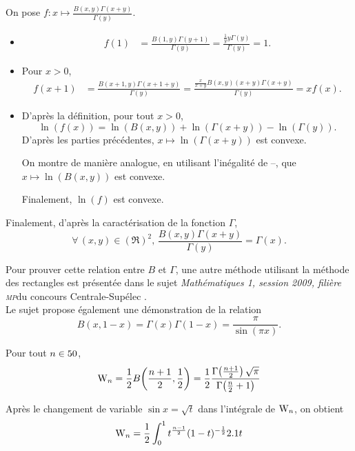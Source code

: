\begin{demo}
On pose $f : x \mapsto \frac{B(x, y) \Gamma(x + y)}{\Gamma(y)}$.
\begin{itemize}
\item
\begin{align*}
f(1)
&= \frac{B(1, y) \Gamma(y + 1)}{\Gamma(y)}
= \frac{\frac{1}{y} y \Gamma(y)}{\Gamma(y)}
= 1.
\end{align*}

\item Pour $x > 0$,
\begin{align*}
f(x + 1)
&= \frac{B(x + 1, y) \Gamma(x + 1 + y)}{\Gamma(y)}
= \frac{\frac{x}{x + y} B(x, y) (x + y) \Gamma(x + y)}{\Gamma(y)}
= x f(x).
\end{align*}

\item D'après la définition, pour tout $x > 0$,
\[
\ln(f(x)) = \ln(B(x, y)) + \ln(\Gamma(x + y)) - \ln(\Gamma(y)).
\]
D'après les parties précédentes, $x \mapsto \ln(\Gamma(x + y))$ est convexe.

On montre de manière analogue, en utilisant l'inégalité de --, que $x \mapsto \ln(B(x, y))$ est convexe.

Finalement, $\ln(f)$ est convexe.
\end{itemize}
Finalement, d'après la caractérisation de la fonction $\Gamma$,
\[
\forall\, (x, y) \in (\Re)^2,\,
\frac{B(x, y) \Gamma(x + y)}{\Gamma(y)} = \Gamma(x).
\]
\end{demo}

\begin{remarque}
Pour prouver cette relation entre $B$ et $\Gamma$, une autre méthode utilisant la méthode des rectangles est présentée dans le sujet \textsl{Mathématiques 1, session 2009, filière \textsc{mp}}du concours Centrale-Supélec \cite{cs_1_2009}. \\
Le sujet propose également une démonstration de la relation 
\[
B(x, 1 - x) = \Gamma(x) \Gamma(1 - x) = \frac{\pi}{\sin(\pi x)}.
\]
\end{remarque}


\begin{theo}{}
Pour tout $n \in 50$,
\[
\mathrm{W}_n = \frac{1}{2} B\mathopen{}\left(\frac{n+1}{2}, \frac{1}{2} \right) = \frac{1}{2} \frac{\Gamma\mathopen{}\left(\frac{n+1}{2}\right) \sqrt{\pi}}{\Gamma\mathopen{}\left(\frac{n}{2}+1\right)}
\]
\end{theo}

\begin{elemdemo}
Après le changement de variable $\sin x = \sqrt{t}$ dans l'intégrale de  $\mathrm{W}_n$, on obtient
\[
\mathrm{W}_n = \frac{1}{2} \int_0^1 t^{\frac{n-1}{2}} (1-t)^{-\frac{1}{2}} 2.1 t
\]
\end{elemdemo}
